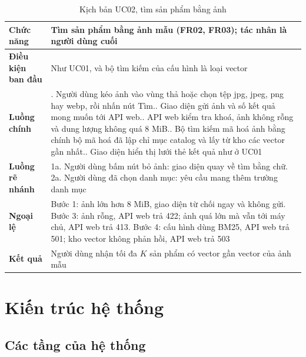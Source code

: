 \begin{table}[!htbp]
\centering
\caption{Kịch bản UC02, tìm sản phẩm bằng ảnh}
\label{tab:c3_uc02}
\footnotesize
\renewcommand{\arraystretch}{1.0}
\begin{tabularx}{\textwidth}{@{}p{3.0cm} >{\raggedright\arraybackslash}X@{}}
\toprule
\textbf{Chức năng} & Tìm sản phẩm bằng ảnh mẫu (FR02, FR03); tác nhân là người dùng cuối \\
\midrule
\textbf{Điều kiện ban đầu} & Như UC01, và bộ tìm kiếm của cấu hình là loại vector \\
\midrule
\textbf{Luồng chính} & 1. Người dùng kéo ảnh vào vùng thả hoặc chọn tệp jpg, jpeg, png hay webp, rồi nhấn nút Tìm.\newline
2. Giao diện gửi ảnh và số kết quả mong muốn tới API web.\newline
3. API web kiểm tra khoá, ảnh không rỗng và dung lượng không quá 8 MiB.\newline
4. Bộ tìm kiếm mã hoá ảnh bằng chính bộ mã hoá đã lập chỉ mục catalog và lấy từ kho các vector gần nhất.\newline
5. Giao diện hiển thị lưới thẻ kết quả như ở UC01 \\
\midrule
\textbf{Luồng rẽ nhánh} & 1a. Người dùng bấm nút bỏ ảnh: giao diện quay về tìm bằng chữ.\newline
2a. Người dùng đã chọn danh mục: yêu cầu mang thêm trường danh mục \\
\midrule
\textbf{Ngoại lệ} & Bước 1: ảnh lớn hơn 8 MiB, giao diện từ chối ngay và không gửi.\newline
Bước 3: ảnh rỗng, API web trả 422; ảnh quá lớn mà vẫn tới máy chủ, API web trả 413.\newline
Bước 4: cấu hình dùng BM25, API web trả 501; kho vector không phản hồi, API web trả 503 \\
\midrule
\textbf{Kết quả} & Người dùng nhận tối đa $K$ sản phẩm có vector gần vector của ảnh mẫu \\
\bottomrule
\end{tabularx}
\end{table}

\section{Kiến trúc hệ thống}
\label{sec:kien-truc}

\subsection{Các tầng của hệ thống}

